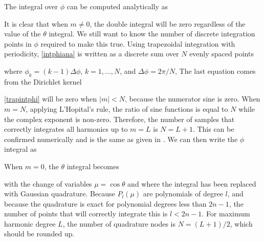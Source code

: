 The integral over $\phi$ can be computed analytically as

It is clear that when $m\ne0$, the double integral will be zero regardless of the value of the $\theta$ integral. We still want to know the number of discrete integration points in $\phi$ required to make this true.  Using trapezoidal integration with periodicity, \eqref{intphiana} is written as a discrete sum over $N$ evenly spaced points

\noindent where $\phi_k = (k-1) \Delta\phi$, $k = 1,...,N$, and $\Delta \phi = 2\pi/N$, The last equation comes from the Dirichlet kernel

\eqref{trapintphi} will be zero when $\vert m \vert < N$, because the numerator sine is zero. When $m = N$, applying L'Hopital's rule, the ratio of sine functions is equal to $N$ while the complex exponent is non-zero. Therefore, the number of samples that correctly integrates all harmonics up to $m = L$ is $N = L + 1$. This can be confirmed numerically and is the same as given in \cite{darve2000fast, beentjes2015quadrature}. We can then write the $\phi$ integral as 

When $m=0$, the $\theta$ integral becomes 

with the change of variables $\mu = \cos\theta$ and where the integral has been replaced with Gaussian quadrature. Because $P_l(\mu)$ are polynomials of degree $l$, and because the quadrature is exact for polynomial degrees less than $2n-1$, the number of points that will correctly integrate this is $ l  < 2 n - 1$. For maximum harmonic degree $L$, the number of quadrature nodes is $N = (L+1)/2$, which should be rounded up.  
	
